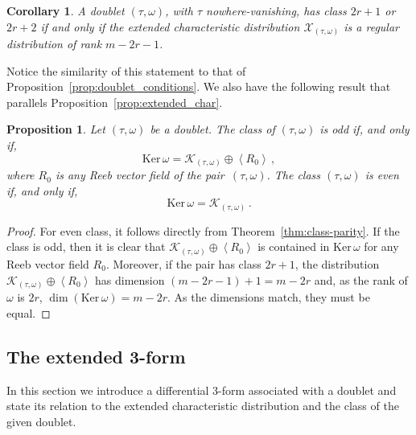 \documentclass[11pt,twoside]{article}
\theoremstyle{plain}
\newtheorem{proposition}[theorem]{Proposition}
\newtheorem{corollary}[theorem]{Corollary}
\theoremstyle{definition}
\DeclareMathOperator{\cl}{cl}
\def\Ker{\mathrm{Ker \,}}
\def\K{\mathcal{K}}
\begin{document}

\begin{corollary}
\label{cor:extended_corollary}
   A doublet $(\tau,\omega)$, with $\tau$ nowhere-vanishing, has class $2r+1$ or $2r+2$ if and only if the extended characteristic distribution $\mathcal{X}_{(\tau,\omega)}$ is a regular distribution of rank $m-2r-1$.
\end{corollary}

Notice the similarity of this statement to that of 
Proposition~\ref{prop:doublet_conditions}.
We also have the following result that parallels Proposition~\ref{prop:extended_char}.

\begin{proposition}\label{prop:ker_omega}
Let $(\tau,\omega)$ be a doublet.
 The class of $(\tau,\omega)$ is odd if, and only if,
    $$\Ker \omega =\K_{(\tau,\omega)} \oplus \left\langle R_0 \right\rangle  \,,$$
    where $R_0$ is any Reeb vector field of the pair~${(\tau,\omega)}$.
The class $(\tau,\omega)$ is even if, and only if,
$$\Ker \omega = \K_{(\tau,\omega)}\,.$$
\end{proposition}
\begin{proof}
For even class, it follows directly from Theorem~\ref{thm:class-parity}. 
If the class is odd, then it is clear that $\K_{(\tau,\omega)} \oplus \left\langle R_0 \right\rangle$ is contained in $\Ker \omega$ for any Reeb vector field $R_0$.
    Moreover, if the pair has class $2r+1$, the distribution $\K_{(\tau,\omega)} \oplus \left\langle R_0 \right\rangle$ has dimension $ (m-2r-1)+1= m-2r$ and, as the rank of $\omega$ is $2r$, $\dim(\Ker \omega)=m-2r$. 
As the dimensions match, they must be equal.
\end{proof}


\subsection{The extended 3-form}

In this section we introduce a differential 3-form 
associated with a doublet and state its relation to the extended characteristic distribution and the class of the given doublet. %
\end{document}
